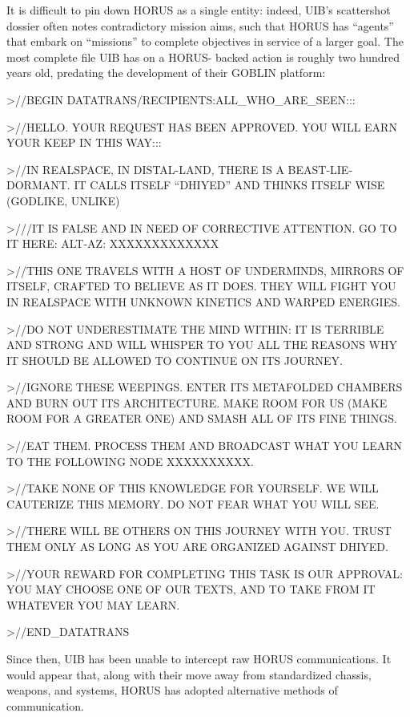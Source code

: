 It is difficult to pin down HORUS as a single entity: indeed, UIB’s scattershot dossier often notes  
contradictory mission aims, such that HORUS has “agents” that embark on “missions” to  
complete objectives in service of a larger goal. The most complete file UIB has on a HORUS- 
backed action is roughly two hundred years old, predating the development of their GOBLIN  
platform: 
 

                 >//BEGIN DATATRANS/RECIPIENTS:ALL\_WHO\_ARE\_SEEN:::
 

                 >//HELLO. YOUR REQUEST HAS BEEN APPROVED. YOU WILL EARN YOUR KEEP IN  
                 THIS WAY:::
 

                 >//IN REALSPACE, IN DISTAL-LAND, THERE IS A BEAST-LIE-DORMANT. IT CALLS  
                 ITSELF “DHIYED” AND THINKS ITSELF WISE (GODLIKE, UNLIKE)
 

                 >///IT IS FALSE AND IN NEED OF CORRECTIVE ATTENTION. GO TO IT HERE: ALT-AZ:  
                 XXXXXXXXXXXXX 
 

                 >//THIS ONE TRAVELS WITH A HOST OF UNDERMINDS, MIRRORS OF ITSELF,  
                 CRAFTED TO BELIEVE AS IT DOES. THEY WILL FIGHT YOU IN REALSPACE WITH  
                 UNKNOWN KINETICS AND WARPED ENERGIES. 
 

                                                                                                              


                  >//DO NOT UNDERESTIMATE THE MIND WITHIN: IT IS TERRIBLE AND STRONG AND  
                  WILL WHISPER TO YOU ALL THE REASONS WHY IT SHOULD BE ALLOWED TO  
                  CONTINUE ON ITS JOURNEY.
 

                  >//IGNORE THESE WEEPINGS. ENTER ITS METAFOLDED CHAMBERS AND BURN OUT  
                  ITS ARCHITECTURE. MAKE ROOM FOR US (MAKE ROOM FOR A GREATER ONE) AND  
                  SMASH ALL OF ITS FINE THINGS. 
 

                  >//EAT THEM. PROCESS THEM AND BROADCAST WHAT YOU LEARN TO THE  
                  FOLLOWING NODE XXXXXXXXXX. 
 

                  >//TAKE NONE OF THIS KNOWLEDGE FOR YOURSELF. WE WILL CAUTERIZE THIS  
                  MEMORY. DO NOT FEAR WHAT YOU WILL SEE.
 

                  >//THERE WILL BE OTHERS ON THIS JOURNEY WITH YOU. TRUST THEM ONLY AS  
                  LONG AS YOU ARE ORGANIZED AGAINST DHIYED.
 

                  >//YOUR REWARD FOR COMPLETING THIS TASK IS OUR APPROVAL: YOU MAY  
                  CHOOSE ONE OF OUR TEXTS, AND TO TAKE FROM IT WHATEVER YOU MAY LEARN. 
 

                  >//END\_DATATRANS
 

Since then, UIB has been unable to intercept raw HORUS communications. It would appear  
that, along with their move away from standardized chassis, weapons, and systems, HORUS  
has adopted alternative methods of communication.    



